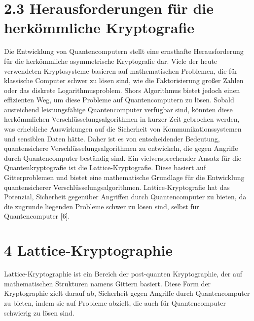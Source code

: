 \section{2.3 Herausforderungen für die herkömmliche Kryptografie}
Die Entwicklung von Quantencomputern stellt eine ernsthafte Herausforderung für die herkömmliche asymmetrische Kryptografie dar. Viele der heute verwendeten Kryptosysteme basieren auf mathematischen Problemen, die für klassische Computer schwer zu lösen sind, wie die Faktorisierung großer Zahlen oder das diskrete Logarithmusproblem. Shors Algorithmus bietet jedoch einen effizienten Weg, um diese Probleme auf Quantencomputern zu lösen.
Sobald ausreichend leistungsfähige Quantencomputer verfügbar sind, könnten diese herkömmlichen Verschlüsselungsalgorithmen in kurzer Zeit gebrochen werden, was erhebliche Auswirkungen auf die Sicherheit von Kommunikationssystemen und sensiblen Daten hätte. Daher ist es von entscheidender Bedeutung, quantensichere Verschlüsselungsalgorithmen zu entwickeln, die gegen Angriffe durch Quantencomputer beständig sind.
Ein vielversprechender Ansatz für die Quantenkryptografie ist die Lattice-Kryptografie. Diese basiert auf Gitterproblemen und bietet eine mathematische Grundlage für die Entwicklung quantensicherer Verschlüsselungsalgorithmen. Lattice-Kryptografie hat das Potenzial, Sicherheit gegenüber Angriffen durch Quantencomputer zu bieten, da die zugrunde liegenden Probleme schwer zu lösen sind, selbst für Quantencomputer [6].

\section{4 Lattice-Kryptographie}
Lattice-Kryptographie ist ein Bereich der post-quanten Kryptographie, der auf mathematischen Strukturen namens Gittern basiert. Diese Form der Kryptographie zielt darauf ab, Sicherheit gegen Angriffe durch Quantencomputer zu bieten, indem sie auf Probleme abzielt, die auch für Quantencomputer schwierig zu lösen sind.

